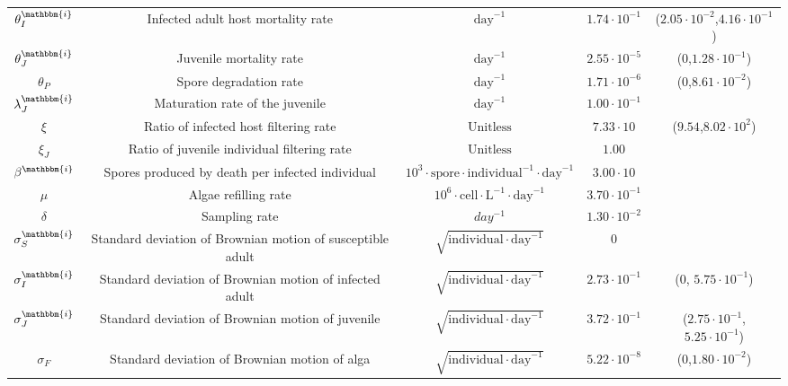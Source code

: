 \documentclass[aoas,preprint]{imsart}\usepackage[]{graphicx}\usepackage[]{xcolor}
\newcommand\invasive{\mathbbm{i}}
\begin{document}
\begin{table}[H]
{\begin{tabular}{||c|c |c|c|c||}
$\theta^{\invasive}_{I}$ & Infected adult host mortality rate        &     $ \mathrm{day}^{-1}$     & $1.74\cdot 10^{-1}$  & ($2.05\cdot 10^{-2}$,$4.16\cdot 10^{-1}$)\\
$\theta^{\invasive}_{J}$ & Juvenile mortality rate        &     $  \mathrm{day}^{-1}$     & $2.55\cdot 10^{-5}$  & (0,$1.28\cdot 10^{-1}$)\\
$\theta_{P}$   & Spore degradation rate                           &     $ \mathrm{day}^{-1}$     & $1.71\cdot 10^{-6}$   & (0,$8.61\cdot 10^{-2}$)\\
$\lambda^{\invasive}_{J}$ & Maturation rate of the juvenile                  &     $ \mathrm{day}^{-1} $                  & $1.00\cdot 10^{-1}$  & \\
$\xi$           & Ratio of infected host filtering rate       &     $\mathrm{Unitless}$                    & $7.33\cdot 10$         & ($9.54$,$8.02\cdot 10^{2}$)\\
$\xi_J$         & Ratio of juvenile individual filtering rate &     $\mathrm{Unitless}$                    & $1.00$ & \\
$\beta^{\invasive}$       & Spores produced by death per infected individual     &  $10^3 \cdot \mathrm{spore} \cdot \mathrm{individual}^{-1} \cdot \mathrm{day}^{-1}$  & $3.00\cdot 10$ & \\
$\mu$           & Algae refilling rate                                &  $10^6 \cdot \mathrm{cell} \cdot \mathrm{L} ^{-1} \cdot \mathrm{day}^{-1}$                 & $3.70\cdot 10^{-1}$ & \\
$\delta$        & Sampling rate                                      &  $day ^{-1}$                                                                         & $1.30\cdot 10^{-2}$ & \\
$\sigma^{\invasive}_{S}$ & Standard deviation of Brownian motion of susceptible adult         &   $\sqrt{\mathrm{individual} \cdot \mathrm{day}^{-1}}$  & 0  & \\
$\sigma^{\invasive}_{I}$ & Standard deviation of Brownian motion of infected adult         &   $\sqrt{\mathrm{individual} \cdot \mathrm{day}^{-1}}$  & $2.73\cdot 10^{-1}$  & (0, $5.75\cdot 10^{-1}$)\\
$\sigma^{\invasive}_{J}$ & Standard deviation of Brownian motion of juvenile               &   $\sqrt{\mathrm{individual} \cdot \mathrm{day}^{-1}}$  & $3.72\cdot 10^{-1}$  & ($2.75\cdot 10^{-1}$, $5.25\cdot 10^{-1}$)\\
$\sigma_{F}$   & Standard deviation of Brownian motion of alga                          &   $\sqrt{\mathrm{individual} \cdot \mathrm{day}^{-1}}$  & $5.22\cdot 10^{-8}$  & (0,$1.80\cdot 10^{-2}$)\\

\end{tabular}}
\end{table}
\end{document}
